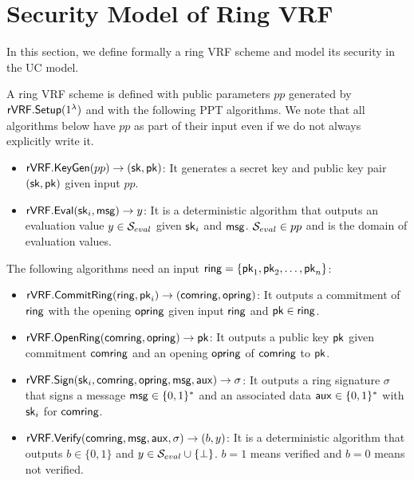 


\section{Security Model  of Ring VRF}

In this section, we define formally a ring VRF scheme and model its security in the UC model.

\begin{definition} \label{def:ringVRF}	A ring VRF scheme is defined with public parameters $ pp $ generated by  $ {\mathsf{rVRF}}.{\mathsf{Setup}}(1^\lambda) $ and with the following  PPT algorithms. We note that  all algorithms below have $ pp $ as part of their input even if we do not always explicitly write it.
	
	\begin{itemize}
		\item $ {\mathsf{rVRF}}.{\mathsf{KeyGen}}(pp) \rightarrow (\mathsf{sk},\mathsf{pk})$: It generates a secret key and public key pair $ (\mathsf{sk},\mathsf{pk}) $ given input $ pp $.
		\item $ {\mathsf{rVRF}}.{\mathsf{Eval}}(\mathsf{sk}_i, \mathsf{msg}) \rightarrow y$: It is a deterministic algorithm that outputs an evaluation value $ y \in {\ensuremath{\mathcal{S}}}_{eval}$ given  $ \mathsf{sk}_i $ and $ \mathsf{msg} $. $ {\mathcal{S}}_{eval} \in pp$ and is the domain  of  evaluation values.
	\end{itemize}
	The following algorithms need an input $ \mathsf{ring} = \{ \mathsf{pk}_1, \mathsf{pk}_2, \ldots, \mathsf{pk}_n \}$:
	\begin{itemize}
		\item $ {\mathsf{rVRF}}.{\mathsf{CommitRing}}(\mathsf{ring}, \mathsf{pk}_i)  \rightarrow (\mathsf{comring}, \mathsf{opring})$: It  outputs a commitment of $ \mathsf{ring} $ with the opening $ \mathsf{opring} $ given input  $ \mathsf{ring} $ and $ \mathsf{pk} \in \mathsf{ring} $.
		\item $ {\mathsf{rVRF}}.{\mathsf{OpenRing}}(\mathsf{comring},\mathsf{opring}) \rightarrow \mathsf{pk} $: It  outputs a public key $ \mathsf{pk}  $ given commitment $ \mathsf{comring} $ and an opening $ \mathsf{opring} $ of $\mathsf{comring}$ to $\mathsf{pk}$.
		\item $ {\mathsf{rVRF}}.{\mathsf{Sign}}(\mathsf{sk}_i, \mathsf{comring},\mathsf{opring}, \mathsf{msg}, \mathsf{aux})\rightarrow \sigma$: It  outputs a ring signature  $\sigma $  that signs a message $ \mathsf{msg} \in \{0,1\}^* $ and an associated data $ \mathsf{aux} \in \{0,1\}^*$ with $ \mathsf{sk}_i$ for $ \mathsf{comring} $.
		\item $ {\mathsf{rVRF}}.{\mathsf{Verify}}(\mathsf{comring},\mathsf{msg},\mathsf{aux},\sigma) \rightarrow  (b, y)$: It is a deterministic  algorithm that outputs  $ b \in \{0,1\} $ and $ y \in{\ensuremath{\mathcal{S}}}_{eval}\cup \{\perp\} $. $ b =1 $ means verified and $ b = 0 $ means not verified.
	\end{itemize}
	
\end{definition}


